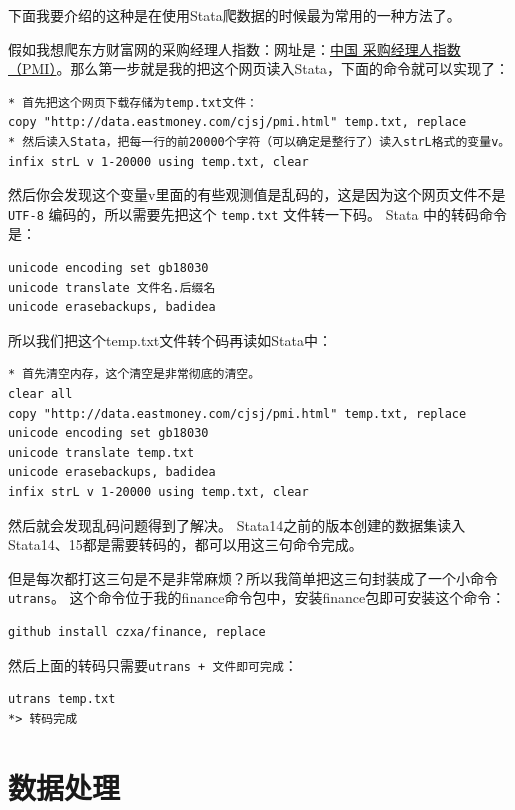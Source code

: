 下面我要介绍的这种是在使用Stata爬数据的时候最为常用的一种方法了。

假如我想爬东方财富网的采购经理人指数：网址是：\href{http://data.eastmoney.com/cjsj/pmi.html}{中国 采购经理人指数（PMI）}。那么第一步就是我的把这个网页读入Stata，下面的命令就可以实现了：

\begin{lstlisting}
* 首先把这个网页下载存储为temp.txt文件：
copy "http://data.eastmoney.com/cjsj/pmi.html" temp.txt, replace
* 然后读入Stata，把每一行的前20000个字符（可以确定是整行了）读入strL格式的变量v。
infix strL v 1-20000 using temp.txt, clear
\end{lstlisting}

然后你会发现这个变量v里面的有些观测值是乱码的，这是因为这个网页文件不是 \texttt{UTF-8} 编码的，所以需要先把这个 \texttt{temp.txt} 文件转一下码。 Stata 中的转码命令是：

\begin{lstlisting}
unicode encoding set gb18030
unicode translate 文件名.后缀名
unicode erasebackups, badidea
\end{lstlisting}

所以我们把这个temp.txt文件转个码再读如Stata中：

\begin{lstlisting}
* 首先清空内存，这个清空是非常彻底的清空。
clear all
copy "http://data.eastmoney.com/cjsj/pmi.html" temp.txt, replace
unicode encoding set gb18030
unicode translate temp.txt
unicode erasebackups, badidea
infix strL v 1-20000 using temp.txt, clear
\end{lstlisting}

然后就会发现乱码问题得到了解决。
Stata14之前的版本创建的数据集读入Stata14、15都是需要转码的，都可以用这三句命令完成。

但是每次都打这三句是不是非常麻烦？所以我简单把这三句封装成了一个小命令\texttt{utrans}。
这个命令位于我的finance命令包中，安装finance包即可安装这个命令：

\begin{lstlisting}
github install czxa/finance, replace
\end{lstlisting}

然后上面的转码只需要\texttt{utrans\ +\ 文件即可完成}：

\begin{lstlisting}
utrans temp.txt
*> 转码完成
\end{lstlisting}

\section{数据处理}

